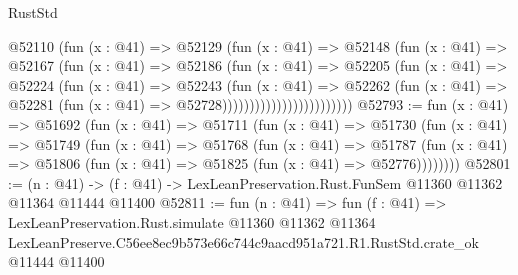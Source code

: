 \begin{lexlean}{RustStd}
\begin{coremodule}
                              @52110
                                (fun (x : @41) =>
                                @52129
                                  (fun (x : @41) =>
                                  @52148
                                    (fun (x : @41) =>
                                    @52167
                                      (fun (x : @41) =>
                                      @52186
                                        (fun (x : @41) =>
                                        @52205
                                          (fun (x : @41) =>
                                          @52224
                                            (fun (x : @41) =>
                                            @52243
                                              (fun (x : @41) =>
                                              @52262
                                                (fun (x : @41) =>
                                                @52281
                                                  (fun (x : @41) => @52728))))))))))))))))))))))))
@52793 := fun (x : @41) =>
  @51692
    (fun (x : @41) =>
    @51711
      (fun (x : @41) =>
      @51730
        (fun (x : @41) =>
        @51749
          (fun (x : @41) =>
          @51768
            (fun (x : @41) =>
            @51787
              (fun (x : @41) => @51806 (fun (x : @41) => @51825 (fun (x : @41) => @52776))))))))
@52801 := (n : @41) ->
  (f : @41) -> LexLeanPreservation.Rust.FunSem @11360 @11362 @11364 @11444 @11400
@52811 := fun (n : @41) =>
  fun (f : @41) =>
  LexLeanPreservation.Rust.simulate
    @11360
    @11362
    @11364
    LexLeanPreserve.C56ee8ec9b573e66c744c9aacd951a721.R1.RustStd.crate_ok
    @11444
    @11400
\end{coremodule}
\end{lexlean}
